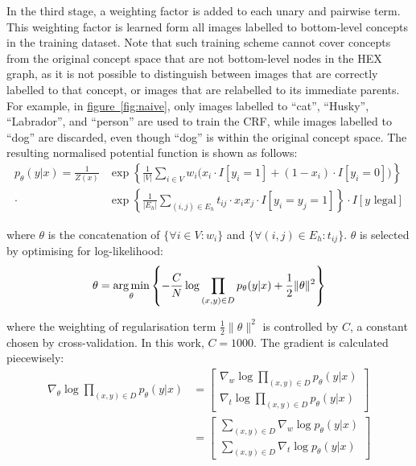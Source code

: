 \documentclass[11pt,a4paper]{book}
\newcommand{\argmin}{\operatornamewithlimits{arg\,min}}
\begin{document}
In the third stage, a weighting factor is added to each unary and pairwise term. This weighting factor is learned form all images labelled to bottom-level concepts in the training dataset. Note that such training scheme cannot cover concepts from the original concept space that are not bottom-level nodes in the HEX graph, as it is not possible to distinguish between images that are correctly labelled to that concept, or images that are relabelled to its immediate parents. For example, in \hyperref[fig:naive]{figure~\ref{fig:naive}}, only images labelled to ``cat'', ``Husky'', ``Labrador'', and ``person'' are used to train the CRF, while images labelled to ``dog'' are discarded, even though ``dog'' is within the original concept space. The resulting normalised potential function is shown as follows:
\begin{align}
p_\theta(y|x)=\frac{1}{Z(x)}&\exp\left\{\frac{1}{|V|}\sum_{i\in V}w_i\big(x_i\cdot I[y_i=1]+(1-x_i)\cdot I[y_i=0]\big)\right\}\nonumber\\
\cdot&\exp\left\{\frac{1}{|E_h|}\sum_{(i,j)\in E_h}t_{ij}\cdot x_ix_j\cdot I[y_i=y_j=1]\right\}\cdot I[y\text{ legal}]
\end{align}

where $\theta$ is the concatenation of $\{\forall i\in V:w_i\}$ and $\{\forall(i,j)\in E_h:t_{ij}\}$. $\theta$ is selected by optimising for log-likelihood:
\begin{equation}
\theta=\argmin_\theta\left\{-\frac{C}{N}\log\prod_{(x,y)\in D}p_\theta(y|x)+\frac{1}{2}\|\theta\|^2\right\}
\end{equation}

where the weighting of regularisation term $\frac{1}{2}\|\theta\|^2$ is controlled by $C$, a constant chosen by cross-validation. In this work, $C=1000$. The gradient is calculated piecewisely:
\begin{align}
\nabla_\theta\log\prod_{(x,y)\in D}p_\theta(y|x)&=\begin{bmatrix}
\nabla_w\log\prod_{(x,y)\in D}p_\theta(y|x)\\ 
\nabla_t\log\prod_{(x,y)\in D}p_\theta(y|x)
\end{bmatrix}\nonumber\\
&=\begin{bmatrix}
\sum_{(x,y)\in D}\nabla_w\log p_\theta(y|x)\\ 
\sum_{(x,y)\in D}\nabla_t\log p_\theta(y|x)
\end{bmatrix}
\label{eqn:nablatheta}
\end{align}
\end{document}

